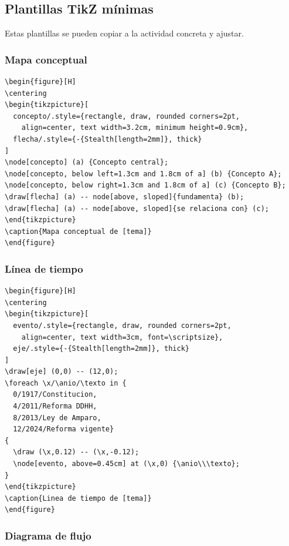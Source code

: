 \subsection{Plantillas TikZ mínimas}

Estas plantillas se pueden copiar a la actividad concreta y ajustar.

\subsubsection*{Mapa conceptual}

\begin{verbatim}
\begin{figure}[H]
\centering
\begin{tikzpicture}[
  concepto/.style={rectangle, draw, rounded corners=2pt,
    align=center, text width=3.2cm, minimum height=0.9cm},
  flecha/.style={-{Stealth[length=2mm]}, thick}
]
\node[concepto] (a) {Concepto central};
\node[concepto, below left=1.3cm and 1.8cm of a] (b) {Concepto A};
\node[concepto, below right=1.3cm and 1.8cm of a] (c) {Concepto B};
\draw[flecha] (a) -- node[above, sloped]{fundamenta} (b);
\draw[flecha] (a) -- node[above, sloped]{se relaciona con} (c);
\end{tikzpicture}
\caption{Mapa conceptual de [tema]}
\end{figure}
\end{verbatim}

\subsubsection*{Línea de tiempo}

\begin{verbatim}
\begin{figure}[H]
\centering
\begin{tikzpicture}[
  evento/.style={rectangle, draw, rounded corners=2pt,
    align=center, text width=3cm, font=\scriptsize},
  eje/.style={-{Stealth[length=2mm]}, thick}
]
\draw[eje] (0,0) -- (12,0);
\foreach \x/\anio/\texto in {
  0/1917/Constitucion,
  4/2011/Reforma DDHH,
  8/2013/Ley de Amparo,
  12/2024/Reforma vigente}
{
  \draw (\x,0.12) -- (\x,-0.12);
  \node[evento, above=0.45cm] at (\x,0) {\anio\\\texto};
}
\end{tikzpicture}
\caption{Linea de tiempo de [tema]}
\end{figure}
\end{verbatim}

\subsubsection*{Diagrama de flujo}

